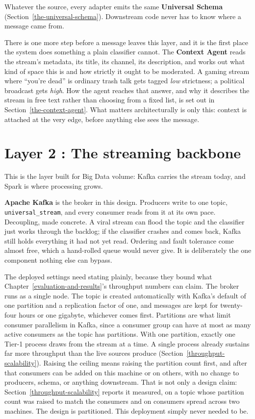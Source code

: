 Whatever the source, every adapter emits the same \textbf{Universal Schema} (Section~\ref{the-universal-schema}). Downstream code never has to know where a message came from.

There is one more step before a message leaves this layer, and it is the first place the system does something a plain classifier cannot. The \textbf{Context Agent} reads the stream's metadata, its title, its channel, its description, and works out what kind of space this is and how strictly it ought to be moderated. A gaming stream where ``you're dead'' is ordinary trash talk gets tagged \emph{low} strictness; a political broadcast gets \emph{high}. How the agent reaches that answer, and why it describes the stream in free text rather than choosing from a fixed list, is set out in Section~\ref{the-context-agent}. What matters architecturally is only this: context is attached at the very edge, before anything else sees the message.

\section{Layer 2 : The streaming backbone}\label{layer-2-the-streaming-backbone}

This is the layer built for Big Data volume: Kafka carries the stream today, and Spark is where processing grows.

\textbf{Apache Kafka} is the broker in this design. Producers write to one topic, \texttt{universal\_stream}, and every consumer reads from it at its own pace. Decoupling, made concrete. A viral stream can flood the topic and the classifier just works through the backlog; if the classifier crashes and comes back, Kafka still holds everything it had not yet read. Ordering and fault tolerance come almost free, which a hand-rolled queue would never give. It is deliberately the one component nothing else can bypass.

The deployed settings need stating plainly, because they bound what Chapter~\ref{evaluation-and-results}'s throughput numbers can claim. The broker runs as a single node. The topic is created automatically with Kafka's default of one partition and a replication factor of one, and messages are kept for twenty-four hours or one gigabyte, whichever comes first. Partitions are what limit consumer parallelism in Kafka, since a consumer group can have at most as many active consumers as the topic has partitions. With one partition, exactly one Tier-1 process draws from the stream at a time. A single process already sustains far more throughput than the live sources produce (Section~\ref{throughput-scalability}). Raising the ceiling means raising the partition count first, and after that consumers can be added on this machine or on others, with no change to producers, schema, or anything downstream. That is not only a design claim: Section~\ref{throughput-scalability} reports it measured, on a topic whose partition count was raised to match the consumers and on consumers spread across two machines. The design is partitioned. This deployment simply never needed to be.

